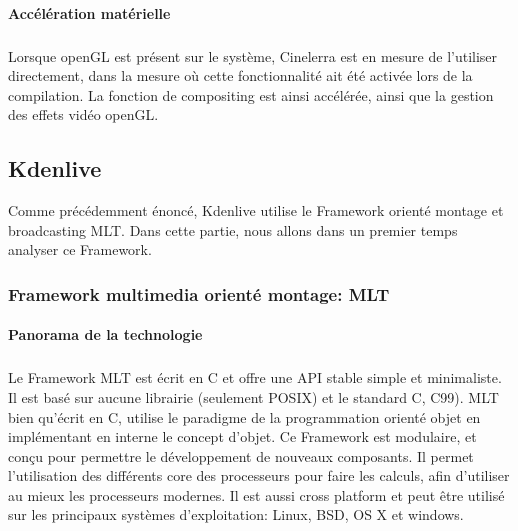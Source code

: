 \paragraph{Accélération matérielle}

\subparagraph{}

Lorsque openGL est présent sur le système, Cinelerra
est en mesure de l'utiliser directement, dans la mesure où cette
fonctionnalité ait été activée lors de la compilation. La fonction
de compositing est ainsi accélérée, ainsi que la gestion des effets
vidéo openGL.

\subsection {Kdenlive}

Comme précédemment énoncé, Kdenlive utilise le Framework orienté
montage et broadcasting MLT. Dans cette partie, nous allons
dans un premier temps analyser ce Framework.

\subsubsection {Framework multimedia orienté montage: MLT}

\paragraph {Panorama de la technologie} %

\subparagraph{}

Le Framework MLT est écrit en C et offre une API
stable simple et minimaliste. Il est basé sur aucune librairie
(seulement POSIX)  et
le standard C, C99). MLT bien qu'écrit en C, utilise le
paradigme de la programmation orienté objet en implémentant en interne
le concept d'objet. Ce Framework est modulaire, et conçu pour permettre
le développement de nouveaux composants. Il permet l'utilisation des
différents core des processeurs pour faire les calculs, afin d'utiliser
au mieux les processeurs modernes. Il est aussi cross platform et peut
être utilisé sur les principaux systèmes d'exploitation: Linux, BSD,
OS X et windows.

